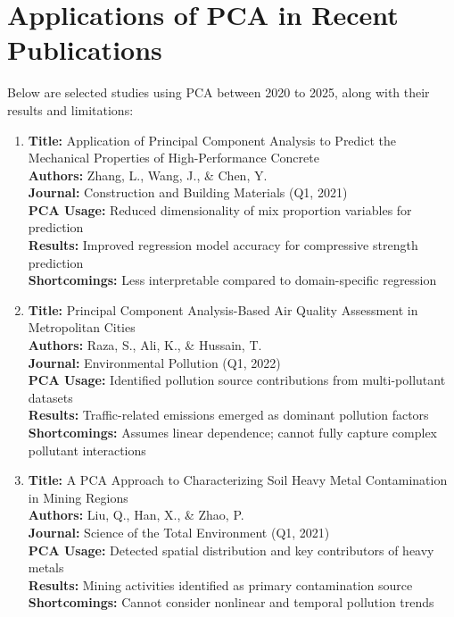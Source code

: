 \documentclass[a4paper,12pt]{article}
\begin{document}
\section{Applications of PCA in Recent Publications}

Below are selected studies using PCA between 2020 to 2025, along with their results and limitations:

\begin{enumerate}[leftmargin=*]
\raggedright

\item \textbf{Title:} Application of Principal Component Analysis to Predict the Mechanical Properties of High-Performance Concrete\\
\textbf{Authors:} Zhang, L., Wang, J., \& Chen, Y.  \\
\textbf{Journal:} Construction and Building Materials (Q1, 2021)  \\
\textbf{PCA Usage:} Reduced dimensionality of mix proportion variables for prediction  \\
\textbf{Results:} Improved regression model accuracy for compressive strength prediction \\ 
\textbf{Shortcomings:} Less interpretable compared to domain-specific regression  \\

\item \textbf{Title:} Principal Component Analysis-Based Air Quality Assessment in Metropolitan Cities  \\
\textbf{Authors:} Raza, S., Ali, K., \& Hussain, T.  \\
\textbf{Journal:} Environmental Pollution (Q1, 2022)  \\
\textbf{PCA Usage:} Identified pollution source contributions from multi-pollutant datasets  \\
\textbf{Results:} Traffic-related emissions emerged as dominant pollution factors  \\
\textbf{Shortcomings:} Assumes linear dependence; cannot fully capture complex pollutant interactions  \\

\item \textbf{Title:} A PCA Approach to Characterizing Soil Heavy Metal Contamination in Mining Regions  \\
\textbf{Authors:} Liu, Q., Han, X., \& Zhao, P.  \\
\textbf{Journal:} Science of the Total Environment (Q1, 2021)  \\
\textbf{PCA Usage:} Detected spatial distribution and key contributors of heavy metals  \\
\textbf{Results:} Mining activities identified as primary contamination source  \\
\textbf{Shortcomings:} Cannot consider nonlinear and temporal pollution trends  \\


\end{enumerate}
\end{document}
